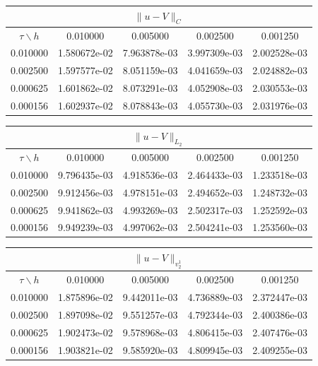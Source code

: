 \documentclass[12pt]{extarticle}
\numberwithin{equation}{section}
\begin{document}
\begin{center}
\begin{tabular}{|c|c|c|c|c|}
\hline
\multicolumn{5}{|c|}{$\|u - V \| _{C}$}\\ 
\hline
$\tau \backslash h$ & 0.010000 & 0.005000 & 0.002500 & 0.001250 \\ 
\hline
0.010000 & 1.580672e-02 & 7.963878e-03 & 3.997309e-03 & 2.002528e-03 \\ 
\hline
0.002500 & 1.597577e-02 & 8.051159e-03 & 4.041659e-03 & 2.024882e-03 \\ 
\hline
0.000625 & 1.601862e-02 & 8.073291e-03 & 4.052908e-03 & 2.030553e-03 \\ 
\hline
0.000156 & 1.602937e-02 & 8.078843e-03 & 4.055730e-03 & 2.031976e-03 \\ 
\hline
\end{tabular}
\end{center}
\begin{center}
\begin{tabular}{|c|c|c|c|c|}
\hline
\multicolumn{5}{|c|}{$\|u - V \| _{L_2}$}\\ 
\hline
$\tau \backslash h$ & 0.010000 & 0.005000 & 0.002500 & 0.001250 \\ 
\hline
0.010000 & 9.796435e-03 & 4.918536e-03 & 2.464433e-03 & 1.233518e-03 \\ 
\hline
0.002500 & 9.912456e-03 & 4.978151e-03 & 2.494652e-03 & 1.248732e-03 \\ 
\hline
0.000625 & 9.941862e-03 & 4.993269e-03 & 2.502317e-03 & 1.252592e-03 \\ 
\hline
0.000156 & 9.949239e-03 & 4.997062e-03 & 2.504241e-03 & 1.253560e-03 \\ 
\hline
\end{tabular}
\end{center}
\begin{center}
\begin{tabular}{|c|c|c|c|c|}
\hline
\multicolumn{5}{|c|}{$\|u - V \| _{v_2^1}$}\\ 
\hline
$\tau \backslash h$ & 0.010000 & 0.005000 & 0.002500 & 0.001250 \\ 
\hline
0.010000 & 1.875896e-02 & 9.442011e-03 & 4.736889e-03 & 2.372447e-03 \\ 
\hline
0.002500 & 1.897098e-02 & 9.551257e-03 & 4.792344e-03 & 2.400386e-03 \\ 
\hline
0.000625 & 1.902473e-02 & 9.578968e-03 & 4.806415e-03 & 2.407476e-03 \\ 
\hline
0.000156 & 1.903821e-02 & 9.585920e-03 & 4.809945e-03 & 2.409255e-03 \\ 
\hline
\end{tabular}
\end{center}
\end{document}
